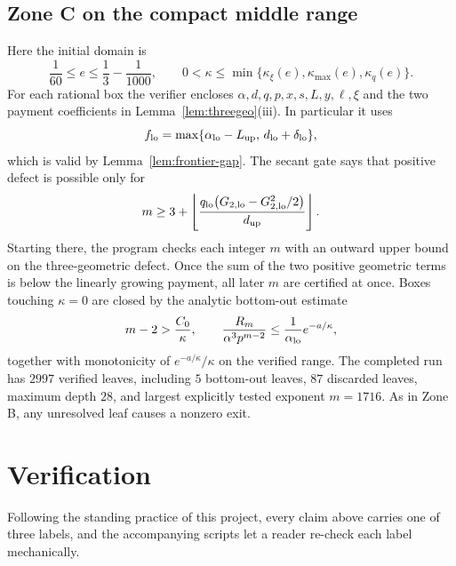 \documentclass[11pt]{article}
\begin{document}
\subsection{Zone C on the compact middle range}

Here the initial domain is
\[
 \frac1{60}\le e\le\frac13-\frac1{1000},
 \qquad
 0<\kappa\le\min\{\kappa_\xi(e),\kappa_{\max}(e),\kappa_q(e)\}.
\]
For each rational box the verifier encloses
$\alpha,d,q,p,x,s,L,y,\ell,\xi$ and the two payment coefficients in
Lemma~\ref{lem:threegeo}(iii).  In particular it uses
\[
 f_{\rm lo}=
 \max\{\alpha_{\rm lo}-L_{\rm up},\,d_{\rm lo}+\delta_{\rm lo}\},
\]
which is valid by Lemma~\ref{lem:frontier-gap}.  The secant gate says that
positive defect is possible only for
\[
 m\ge3+\left\lfloor
 \frac{q_{\rm lo}\bigl(G_{2,\rm lo}-G_{2,\rm lo}^2/2\bigr)}
      {d_{\rm up}}\right\rfloor .
\]
Starting there, the program checks each integer $m$ with an outward upper
bound on the three-geometric defect.  Once the sum of the two positive
geometric terms is below the linearly growing payment, all later $m$ are
certified at once.  Boxes touching $\kappa=0$ are closed by the analytic
bottom-out estimate
\[
 m-2>\frac{C_0}{\kappa},\qquad
 \frac{R_m}{\alpha^3p^{m-2}}
 \le\frac1{\alpha_{\rm lo}}e^{-a/\kappa},
\]
together with monotonicity of $e^{-a/\kappa}/\kappa$ on the verified range.
The completed run has $2997$ verified leaves, including $5$ bottom-out
leaves, $87$ discarded leaves, maximum depth $28$, and largest explicitly
tested exponent $m=1716$.  As in Zone B, any unresolved leaf causes a
nonzero exit.

\section{Verification}\label{sec:verification}

Following the standing practice of this project, every claim above carries
one of three labels, and the accompanying scripts let a reader re-check each
label mechanically.
\end{document}

